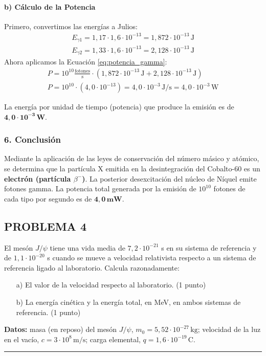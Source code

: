 \paragraph*{b) Cálculo de la Potencia}
Primero, convertimos las energías a Julios:
\begin{gather}
    E_{\gamma1} = 1,17 \cdot 1,6 \cdot 10^{-13} = 1,872 \cdot 10^{-13} \, \text{J} \nonumber \\
    E_{\gamma2} = 1,33 \cdot 1,6 \cdot 10^{-13} = 2,128 \cdot 10^{-13} \, \text{J} \nonumber
\end{gather}
Ahora aplicamos la Ecuación \ref{eq:potencia_gamma}:
\begin{gather}
    P = 10^{10} \frac{\text{fotones}}{\text{s}} \cdot (1,872 \cdot 10^{-13} \, \text{J} + 2,128 \cdot 10^{-13} \, \text{J}) \nonumber \\
    P = 10^{10} \cdot (4,0 \cdot 10^{-13}) = 4,0 \cdot 10^{-3} \, \text{J/s} = 4,0 \cdot 10^{-3} \, \text{W}
\end{gather}
\begin{cajaresultado}
    La energía por unidad de tiempo (potencia) que produce la emisión es de $\boldsymbol{4,0 \cdot 10^{-3} \, \textbf{W}}$.
\end{cajaresultado}

\subsubsection*{6. Conclusión}
\begin{cajaconclusion}
    Mediante la aplicación de las leyes de conservación del número másico y atómico, se determina que la partícula X emitida en la desintegración del Cobalto-60 es un \textbf{electrón (partícula $\beta^-$)}. La posterior desexcitación del núcleo de Níquel emite fotones gamma. La potencia total generada por la emisión de $10^{10}$ fotones de cada tipo por segundo es de $\mathbf{4,0 \, mW}$.
\end{cajaconclusion}

\newpage

\subsection{PROBLEMA 4}
\label{subsec:P4_2022_jun_ord}

\begin{cajaenunciado}
El mesón $J/\psi$ tiene una vida media de $7,2\cdot10^{-21}$ s en su sistema de referencia y de $1,1\cdot10^{-20}$ s cuando se mueve a velocidad relativista respecto a un sistema de referencia ligado al laboratorio. Calcula razonadamente:
\begin{enumerate}
    \item[a)] El valor de la velocidad respecto al laboratorio. (1 punto)
    \item[b)] La energía cinética y la energía total, en MeV, en ambos sistemas de referencia. (1 punto)
\end{enumerate}
\textbf{Datos:} masa (en reposo) del mesón $J/\psi$, $m_{0}=5,52\cdot10^{-27}\,\text{kg}$; velocidad de la luz en el vacío, $c=3\cdot10^{8}\,\text{m/s}$; carga elemental, $q=1,6\cdot10^{-19}\,\text{C}$.
\end{cajaenunciado}
\hrule


